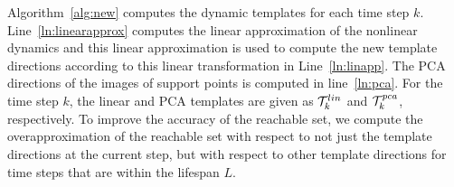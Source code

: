 

Algorithm~\ref{alg:new} computes the dynamic templates for each time step $k$.
%
Line~\ref{ln:linearapprox} computes the linear approximation of the nonlinear dynamics and this linear approximation is used to compute the new template directions according to this linear transformation in Line~\ref{ln:linapp}.
%
The PCA directions of the images of support points is computed in line~\ref{ln:pca}.
%
For the time step $k$, the linear and PCA templates are given as ${\cal T}_{k}^{lin}$ and ${\cal T}_{k}^{pca}$, respectively.
%
To improve the accuracy of the reachable set, we compute the overapproximation of the reachable set with respect to not just the template directions at the current step, but with respect to other template directions for time steps that are within the lifespan $L$.
%
%
%
